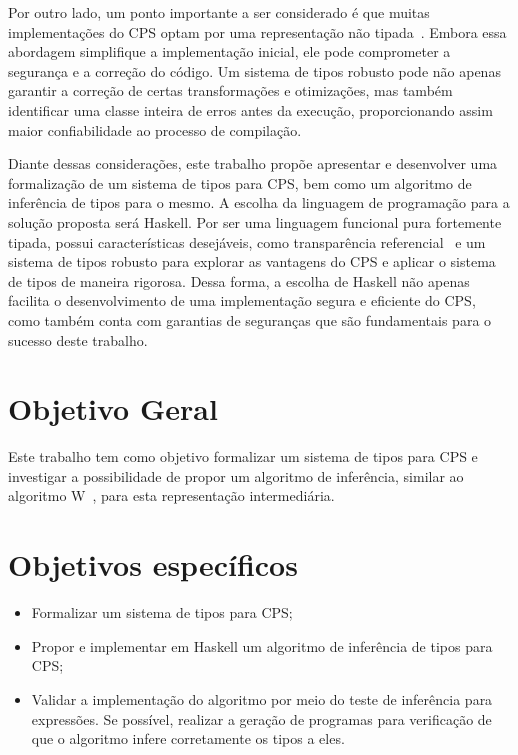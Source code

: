 Por outro lado, um ponto importante a ser considerado é que muitas implementações do CPS optam por uma representação não tipada~\cite{MORRISSET1999}. Embora essa abordagem simplifique a implementação inicial, ele pode comprometer a segurança e a correção do código.
Um sistema de tipos robusto pode não apenas garantir a correção de certas transformações e otimizações, mas também identificar uma classe inteira de erros antes da execução, proporcionando assim maior confiabilidade ao processo de compilação.

Diante dessas considerações, este trabalho propõe apresentar e desenvolver uma formalização de um sistema de tipos para CPS, bem como um algoritmo de inferência de tipos para o mesmo.
A escolha da linguagem de programação para a solução proposta será Haskell.
Por ser uma linguagem funcional pura fortemente tipada, possui características desejáveis, como transparência referencial~\cite{SONDERGAARD1990} e um sistema de tipos robusto para explorar as vantagens do CPS e aplicar o sistema de tipos de maneira rigorosa.
Dessa forma, a escolha de Haskell não apenas facilita o desenvolvimento de uma implementação segura e eficiente do CPS, como também conta com garantias de seguranças que são fundamentais para o sucesso deste trabalho.

\section{Objetivo Geral}\label{sec:objetivo-geral}

Este trabalho tem como objetivo formalizar um sistema de tipos para CPS e investigar a possibilidade de propor um algoritmo de inferência, similar ao algoritmo W~\cite{}, para esta representação intermediária.


\section{Objetivos específicos}\label{sec:objetivos-especificos}

\begin{itemize}
  \item Formalizar um sistema de tipos para CPS;\@
  \item Propor e implementar em Haskell um algoritmo de inferência de tipos para CPS;\@
  \item Validar a implementação do algoritmo por meio do teste de inferência para expressões. Se possível, realizar a geração de programas para verificação de que o algoritmo infere corretamente os tipos a eles.
\end{itemize}

